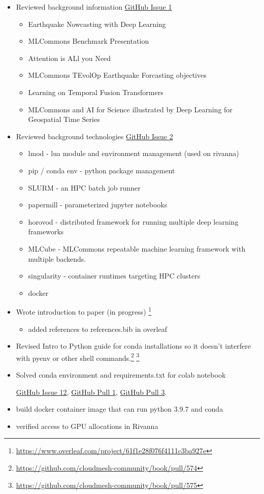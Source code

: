 \documentclass[sigplan,screen]{acmart}
\providecommand{\mlcube}{MLCube}
\newcommand{\GITISSUE}[1]{\href{https://github.com/Data-ScienceHub/mlcommons-science/issues/#1}{GitHub Issue #1}}
\newcommand{\GITPULL}[1]{\href{https://github.com/laszewsk/mlcommons/pull/#1}{GitHub Pull #1}}
\begin{document}
\begin{itemize}
\item Reviewed background information \GITISSUE{1}
    \begin{itemize}
    \item Earthquake Nowcasting with Deep Learning
    \item MLCommons Benchmark Presentation
    \item Attention is ALl you Need
    \item MLCommons TEvolOp Earthquake Forcasting objectives
    \item Learning on Temporal Fusion Transformers
    \item MLCommons and AI for Science illustrated by Deep Learning for Geospatial Time Series
    \end{itemize}
\item Reviewed background technologies \GITISSUE{2}
    \begin{itemize}
    \item lmod - lua module and environment management (used on rivanna)
    \item pip / conda env - python package management
    \item SLURM - an HPC batch job runner
    \item papermill - parameterized jupyter notebooks
    \item horovod - distributed framework for running multiple deep learning frameworks
    \item \mlcube{} - MLCommons repeatable machine learning framework with multiple backends.
    \item singularity - container runtimes targeting HPC clusters
    \item docker
\end{itemize}
\item Wrote introduction to paper (in progress) \footnote{\url{https://www.overleaf.com/project/61f1e28f076f4111c3ba927e}}
    \begin{itemize}
    \item added references to references.bib in overleaf
    \end{itemize}

  \item Revised Intro to Python guide for conda installations so it
    doesn't interfere with pyenv or other shell
    commands.\footnote{\url{https://github.com/cloudmesh-community/book/pull/574}} \footnote{\url{https://github.com/cloudmesh-community/book/pull/575}}

  \item Solved conda environment and requirements.txt for colab notebook

    \GITISSUE{12},
    \GITPULL{1},
    \GITPULL{3}.
  
\item build docker container image that can run python 3.9.7 and conda
\item verified access to GPU allocations in Rivanna

\end{itemize}
\end{document}
